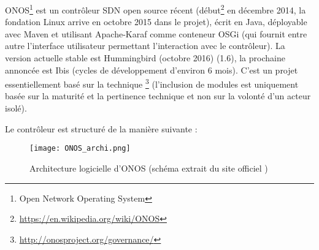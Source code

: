 ONOS\footnote{Open Network Operating System} est un contrôleur SDN open source récent (début\footnote{\url{https://en.wikipedia.org/wiki/ONOS}} en décembre 2014, la fondation Linux arrive en octobre 2015 dans le projet), écrit en Java, déployable avec Maven et utilisant Apache-Karaf comme conteneur OSGi (qui fournit entre autre l’interface utilisateur permettant l’interaction avec le contrôleur).
La version actuelle stable est Hummingbird (octobre 2016) (1.6), la prochaine annoncée est Ibis (cycles de développement d'environ 6 mois). C'est un projet essentiellement basé sur la technique \footnote{\url{http://onosproject.org/governance/}} (l'inclusion de modules est uniquement basée sur la maturité et la pertinence technique et non sur la volonté d'un acteur isolé).

Le contrôleur est structuré de la manière suivante :
\begin{figure}[h]
  	\centering
  	\texttt{[image: ONOS\_archi.png]}
  	\caption{Architecture logicielle d'ONOS (schéma extrait du site officiel \footnotemark)}
\end{figure}


